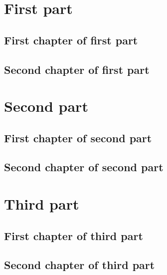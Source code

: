 \documentclass[a4paper,oneside,12pt]{book}
\begin{document}
\setvruler[1cm][0][10][3][0][0pt][0pt][0pt][] %
\doparttoc
\faketableofcontents
\part{First part}
\parttoc
\chapter{First chapter of first part} \chapter{Second chapter of first part}
\part{Second part}
\renewcommand{\mtcgapbeforeheads}{100pt}
\renewcommand{\mtcgapafterheads}{80pt}
\parttoc
\chapter{First chapter of second part} \chapter{Second chapter of second part}
\part{Third part}
\renewcommand{\mtcgapbeforeheads}{20pt}
\renewcommand{\mtcgapafterheads}{10pt}
\parttoc
\chapter{First chapter of third part} \chapter{Second chapter of third part}
\end{document}
